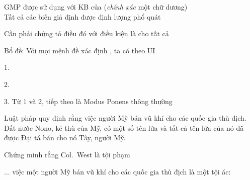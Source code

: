 \documentclass{article}
\begin{document}
\begin{huge}

GMP được sử dụng với KB của  (\emph{chính xác} một chữ dương)\\
Tất cả các biến giả định được định lượng phổ quát


Cần phải chứng tỏ điều đó 
với điều kiện là  cho tất cả 

Bổ đề: Với mọi mệnh đề xác định , ta có  theo UI

1. 

2. 

3. Từ 1 và 2,  tiếp theo là Modus Ponens thông thường


Luật pháp quy định rằng việc người Mỹ bán vũ khí cho
các quốc gia thù địch.  Đất nước Nono, kẻ thù của Mỹ,
có một số tên lửa và tất cả tên lửa của nó đã được Đại tá bán cho nó
Tây, người Mỹ.

Chứng minh rằng Col.~West là tội phạm


$\ldots$ việc một người Mỹ bán vũ khí cho các quốc gia thù địch là một tội ác:


\end{huge}
\end{document}
